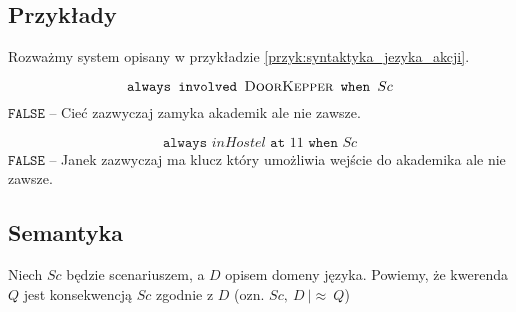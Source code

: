 \subsection{Przykłady}
Rozważmy system opisany w przykładzie \ref{przyk:syntaktyka_jezyka_akcji}.
\begin{example}
	$$
	\texttt{always involved } \textsc{DoorKepper} \texttt{ when } Sc
	$$
	$\texttt{FALSE}$ -- Cieć zazwyczaj zamyka akademik ale nie zawsze.
\end{example}
\begin{example}
	$$
	\texttt{always } inHostel \texttt{ at } 11 \texttt{ when } Sc
	$$
	$\texttt{FALSE}$ -- Janek zazwyczaj ma klucz który umożliwia wejście do akademika ale nie zawsze.
\end{example}


\subsection{Semantyka}
Niech $Sc$ będzie scenariuszem, a $D$ opisem domeny języka. Powiemy, że kwerenda $Q$ jest konsekwencją $Sc$ zgodnie z $D$ (ozn. $Sc,\ D\ |\approx\ Q $)

